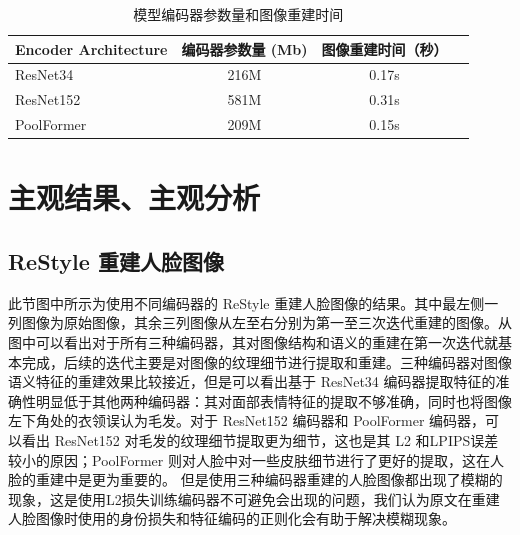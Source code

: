 \begin{table}[htb]
    \centering
    \begin{minipage}[t]{0.55\linewidth} %
        \caption[模型编码器参数量和图像重建时间]{模型编码器参数量和图像重建时间}
        \label{tab:example-table-basic}
        \begin{small}
        \begin{tabular}{@{}lccc@{}}
         \toprule[1.5pt]
        Encoder Architecture & 编码器参数量 (Mb) & 图像重建时间（秒） \\
         \midrule[1pt]
          ResNet34 & 216M & 0.17s \\
          ResNet152 & 581M & 0.31s \\
          PoolFormer & 209M & 0.15s \\
          \bottomrule[1.5pt]
        \end{tabular}
        \end{small}
    \end{minipage}
\end{table}

\section{主观结果、主观分析}

\subsection{ReStyle 重建人脸图像}

此节图中所示为使用不同编码器的 ReStyle 重建人脸图像的结果。其中最左侧一列图像为原始图像，其余三列图像从左至右分别为第一至三次迭代重建的图像。从图中可以看出对于所有三种编码器，其对图像结构和语义的重建在第一次迭代就基本完成，后续的迭代主要是对图像的纹理细节进行提取和重建。三种编码器对图像语义特征的重建效果比较接近，但是可以看出基于 ResNet34 编码器提取特征的准确性明显低于其他两种编码器：其对面部表情特征的提取不够准确，同时也将图像左下角处的衣领误认为毛发。对于 ResNet152 编码器和 PoolFormer 编码器，可以看出 ResNet152 对毛发的纹理细节提取更为细节，这也是其 L2 和LPIPS误差较小的原因；PoolFormer 则对人脸中对一些皮肤细节进行了更好的提取，这在人脸的重建中是更为重要的。
但是使用三种编码器重建的人脸图像都出现了模糊的现象，这是使用L2损失训练编码器不可避免会出现的问题，我们认为原文在重建人脸图像时使用的身份损失和特征编码的正则化会有助于解决模糊现象。

